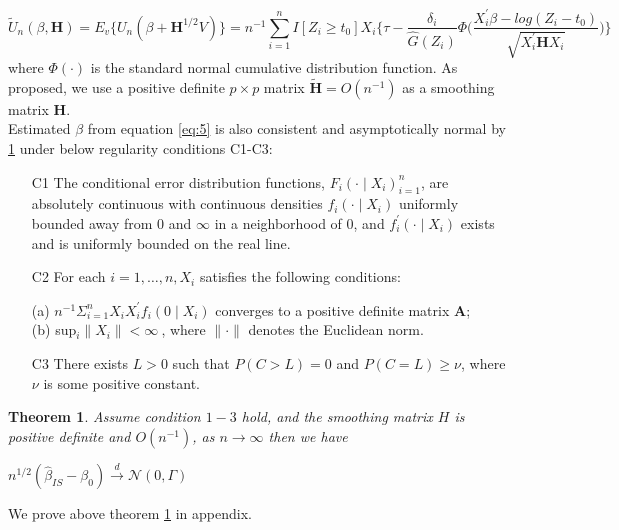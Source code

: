 \documentclass[titlepage,english,12pt]{article}
\newtheorem{theorem}{Theorem}
\begin{document}
	\begin{equation} \label{eq:5}
	\tilde{U}_n(\beta, \textbf{H}) = E_v \{U_n(\beta+\textbf{H}^{1/2}V)\} = n^{-1} \sum_{i=1}^{n} I[Z_i \geq t_0] X_i \Big\{\tau - \frac{\delta_i}{\hat{G}(Z_i)}\Phi\Big(\frac{X_i^\prime\beta-log(Z_i-t_0)}{\sqrt{X_i^{\prime} \textbf{H} X_{i}}}\Big)\Big\}
	\end{equation} 
	where $\Phi(\cdot)$ is the standard normal cumulative distribution function. As \citet{pang2012variance} proposed, we use a positive definite $p \times p$ matrix $\tilde{\textbf{H}} = O(n^{-1})$ as a smoothing matrix $\textbf{H}$.\\ Estimated $\beta$ from equation \ref{eq:5} is also consistent and asymptotically normal by \ref{thm:1} under below regularity conditions C1-C3:
	\begin{enumerate}
		\item[C1] The conditional error distribution functions, $F_{i}(\cdot\mid X_{i})^{n}_{i=1}$, are absolutely continuous with continuous densities $f_{i}(\cdot\mid X_{i})$ uniformly bounded away from $0$ and $\infty$ in a neighborhood of $0$, and $f_{i}^{\prime}(\cdot\mid X_{i})$ exists and is uniformly bounded on the real line.
		\item[C2] For each $i=1,\dots, n, X_{i}$ satisfies the following conditions:
		\begin{flushleft}
			(a) $n^{-1}\Sigma_{i=1}^{n} X_{i} X_{i}^{\prime}f_{i}(0\mid X_{i})$ converges to a positive definite matrix \textbf{A};\\
			(b) sup$_{i}\lVert X_{i} \rVert < \infty\ $, where $\lVert \cdot \rVert$ denotes the Euclidean norm.\\
		\end{flushleft}
		\item[C3] There exists $L>0$ such that $P(C>L)=0$ and $P(C=L)\geq\nu$, where $\nu$ is some positive constant.
	\end{enumerate} 

	\begin{theorem} \label{thm:1}
	Assume condition $1-3$ hold, and the smoothing matrix $H$ is positive definite and $O(n^{-1})$, as $n\to\infty$ then we have
		\begin{center}
			$n^{1/2}(\hat{\beta}_{IS}-\beta_0) \xrightarrow{d} \mathcal{N}(0,\Gamma)$
		\end{center}
	\end{theorem}
	
	\noindent We prove above theorem \ref{thm:1} in appendix.\\
	
\end{document}
